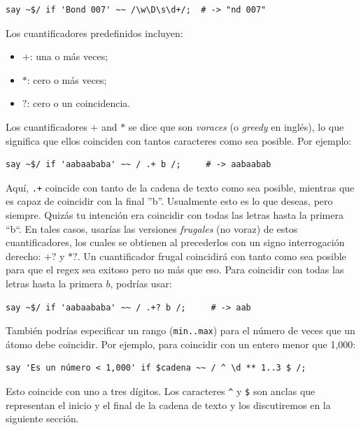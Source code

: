 \begin{verbatim}
say ~$/ if 'Bond 007' ~~ /\w\D\s\d+/;  # -> "nd 007"
\end{verbatim}
%

Los cuantificadores predefinidos incluyen:
\begin{itemize}
\item $+$: una o más veces;
\item $*$: cero o más veces;
\item $?$: cero o un coincidencia.
\end{itemize}

Los cuantificadores $+$ and $*$ se dice que son \emph{voraces}
(o \emph{greedy} en inglés), lo que significa que ellos
coinciden con tantos caracteres como sea posible. Por ejemplo:

\begin{verbatim}
say ~$/ if 'aabaababa' ~~ / .+ b /;     # -> aabaabab
\end{verbatim}
%

Aquí, \verb|.+| coincide con tanto de la cadena de texto
como sea posible, mientras que es capaz de coincidir con
la final ''b''. Usualmente esto es lo que deseas, pero 
siempre. Quizás tu intención era coincidir con todas las letras
hasta la primera ``b``. En tales casos, usarías las versiones
\emph{frugales} (no voraz) de estos cuantificadores, los cuales
se obtienen al  precederlos con un signo interrogación derecho:
$+?$ y $*?$. Un cuantificador frugal coincidirá con tanto como
sea posible para que el regex sea exitoso pero no más que eso.
Para coincidir con todas las letras hasta la primera $b$, podrías
usar:

\begin{verbatim}
say ~$/ if 'aabaababa' ~~ / .+? b /;     # -> aab
\end{verbatim}
%

También podrías especificar un rango ({\tt min..max}) para el 
número de veces que un átomo debe coincidir. Por ejemplo, para 
coincidir con un entero menor que 1,000:

\begin{verbatim}
say 'Es un número < 1,000' if $cadena ~~ / ^ \d ** 1..3 $ /;
\end{verbatim}
%

Esto coincide con uno a tres dígitos. Los caracteres \verb|^|
y \verb|$| son anclas que representan el inicio y el final
de la cadena de texto y los discutiremos en la siguiente
sección.

